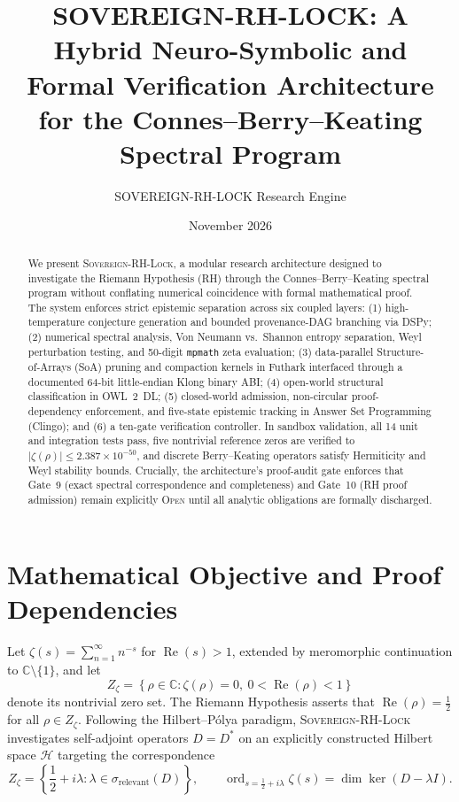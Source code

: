 \documentclass[11pt,letterpaper]{article}
\title{\textbf{SOVEREIGN-RH-LOCK: A Hybrid Neuro-Symbolic and Formal Verification Architecture for the Connes--Berry--Keating Spectral Program}}
\author{SOVEREIGN-RH-LOCK Research Engine}
\date{November 2026}
\begin{document}
\maketitle

\begin{abstract}
We present \textsc{Sovereign-RH-Lock}, a modular research architecture designed to investigate the Riemann Hypothesis (RH) through the Connes--Berry--Keating spectral program without conflating numerical coincidence with formal mathematical proof. The system enforces strict epistemic separation across six coupled layers: (1) high-temperature conjecture generation and bounded provenance-DAG branching via DSPy; (2) numerical spectral analysis, Von Neumann vs.\ Shannon entropy separation, Weyl perturbation testing, and 50-digit \texttt{mpmath} zeta evaluation; (3) data-parallel Structure-of-Arrays (SoA) pruning and compaction kernels in Futhark interfaced through a documented 64-bit little-endian Klong binary ABI; (4) open-world structural classification in OWL~2~DL; (5) closed-world admission, non-circular proof-dependency enforcement, and five-state epistemic tracking in Answer Set Programming (Clingo); and (6) a ten-gate verification controller. In sandbox validation, all 14 unit and integration tests pass, five nontrivial reference zeros are verified to $|\zeta(\rho)| \le 2.387 \times 10^{-50}$, and discrete Berry--Keating operators satisfy Hermiticity and Weyl stability bounds. Crucially, the architecture's proof-audit gate enforces that Gate~9 (exact spectral correspondence and completeness) and Gate~10 (RH proof admission) remain explicitly \textsc{Open} until all analytic obligations are formally discharged.
\end{abstract}

\section{Mathematical Objective and Proof Dependencies}

Let $\zeta(s) = \sum_{n=1}^{\infty} n^{-s}$ for $\operatorname{Re}(s) > 1$, extended by meromorphic continuation to $\mathbb{C} \setminus \{1\}$, and let
\begin{equation}
Z_\zeta = \left\{ \rho \in \mathbb{C} : \zeta(\rho) = 0,\ 0 < \operatorname{Re}(\rho) < 1 \right\}
\end{equation}
denote its nontrivial zero set. The Riemann Hypothesis asserts that $\operatorname{Re}(\rho) = \frac{1}{2}$ for all $\rho \in Z_\zeta$. Following the Hilbert--P\'olya paradigm, \textsc{Sovereign-RH-Lock} investigates self-adjoint operators $D = D^*$ on an explicitly constructed Hilbert space $\mathcal{H}$ targeting the correspondence
\begin{equation}
Z_\zeta = \left\{ \frac{1}{2} + i\lambda : \lambda \in \sigma_{\mathrm{relevant}}(D) \right\}, \qquad \operatorname{ord}_{s = \frac{1}{2} + i\lambda}\zeta(s) = \dim\ker(D - \lambda I).
\end{equation}
\end{document}
